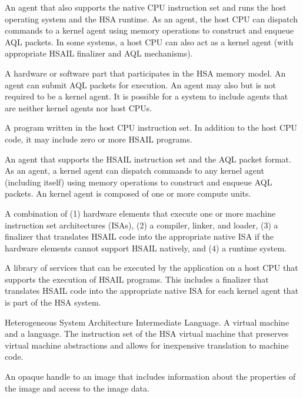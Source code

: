 \documentclass[final,oneside]{book}
\begin{document}
\begin{description}[itemsep=5pt,leftmargin=0cm, labelindent=0cm]
\item[Host CPU] An agent that also supports the native CPU instruction set
  and runs the host operating system and the HSA runtime. As an agent, the
  host CPU can dispatch commands to a kernel agent using memory operations to
  construct and enqueue AQL packets. In some systems, a host CPU can also act as
  a kernel agent (with appropriate HSAIL finalizer and AQL mechanisms).

\item[Agent] A hardware or software part that participates in the HSA
  memory model. An agent can submit AQL packets for execution. An agent
  may also but is not required to be a kernel agent. It is possible for a
  system to include agents that are neither kernel agents nor host CPUs.

\item[HSA application] A program written in the host CPU instruction set. In
  addition to the host CPU code, it may include zero or more HSAIL programs.

\item[kernel agent] An agent that supports the HSAIL instruction set and the
  AQL packet format. As an agent, a kernel agent can dispatch commands to
  any kernel agent (including itself) using memory operations to construct and
  enqueue AQL packets. An kernel agent is composed of one or more compute units.

\item[HSA implementation] A combination of (1) hardware elements that execute
  one or more machine instruction set architectures (ISAs), (2) a compiler,
  linker, and loader, (3) a finalizer that translates HSAIL code into the
  appropriate native ISA if the hardware elements cannot support HSAIL
  natively, and (4) a runtime system.

\item[HSA runtime] A library of services that can be executed by the application
  on a host CPU that supports the execution of HSAIL programs. This includes a
  finalizer that translates HSAIL code into the appropriate native ISA for each
  kernel agent that is part of the HSA system.

\item[HSAIL] Heterogeneous System Architecture Intermediate Language. A virtual
  machine and a language. The instruction set of the HSA virtual machine that
  preserves virtual machine abstractions and allows for inexpensive translation
  to machine code.

\item[Image handle] An opaque handle to an image that includes information about
  the properties of the image and access to the image data.


\end{description}
\end{document}
